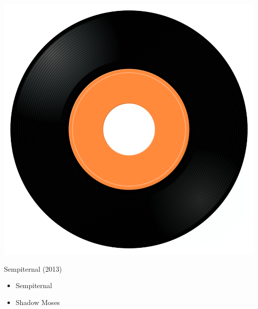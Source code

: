 \begin{minipage}[t]{0.25\textwidth}
\captionsetup{type=figure}
\includegraphics[width=\textwidth]{Images/cover.png}
\caption*{Sempiternal (2013)}
\end{minipage}
\begin{minipage}[t]{0.25\textwidth}\vspace{0pt}
\begin{itemize}[nosep,leftmargin=1em,labelwidth=*,align=left]
	\setlength{\itemsep}{0pt}
	\item Sempiternal
	\item Shadow Moses
\end{itemize}
\end{minipage}

